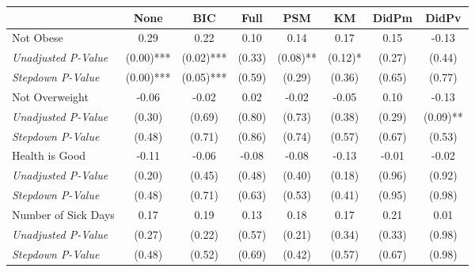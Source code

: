 \begin{tabular}{l c c c c c c c}
\toprule
 & None & BIC & Full & PSM & KM & DidPm & DidPv \\
\midrule
Not Obese & 0.29 & 0.22 & 0.10 & 0.14 & 0.17 & 0.15 & -0.13 \\
\quad \textit{Unadjusted P-Value} & (0.00)*** & (0.02)*** & (0.33) & (0.08)** & (0.12)* & (0.27) & (0.44) \\
\quad \textit{Stepdown P-Value} & (0.00)*** & (0.05)*** & (0.59) & (0.29) & (0.36) & (0.65) & (0.77) \\
Not Overweight & -0.06 & -0.02 & 0.02 & -0.02 & -0.05 & 0.10 & -0.13 \\
\quad \textit{Unadjusted P-Value} & (0.30) & (0.69) & (0.80) & (0.73) & (0.38) & (0.29) & (0.09)** \\
\quad \textit{Stepdown P-Value} & (0.48) & (0.71) & (0.86) & (0.74) & (0.57) & (0.67) & (0.53) \\
Health is Good & -0.11 & -0.06 & -0.08 & -0.08 & -0.13 & -0.01 & -0.02 \\
\quad \textit{Unadjusted P-Value} & (0.20) & (0.45) & (0.48) & (0.40) & (0.18) & (0.96) & (0.92) \\
\quad \textit{Stepdown P-Value} & (0.48) & (0.71) & (0.63) & (0.53) & (0.41) & (0.95) & (0.98) \\
Number of Sick Days & 0.17 & 0.19 & 0.13 & 0.18 & 0.17 & 0.21 & 0.01 \\
\quad \textit{Unadjusted P-Value} & (0.27) & (0.22) & (0.57) & (0.21) & (0.34) & (0.33) & (0.98) \\
\quad \textit{Stepdown P-Value} & (0.48) & (0.52) & (0.69) & (0.42) & (0.57) & (0.67) & (0.98) \\
\bottomrule
\end{tabular}
